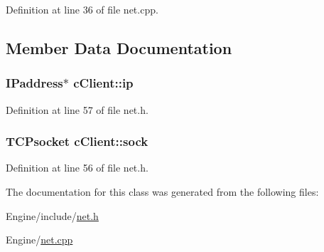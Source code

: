 Definition at line 36 of file net.\-cpp.



\subsection{Member Data Documentation}
\hypertarget{classc_client_ad1240b8a24e3339b48f07bd4de556336}{
\subsubsection[{ip}]{\setlength{\rightskip}{0pt plus 5cm}I\-Paddress$\ast$ c\-Client\-::ip}}\label{classc_client_ad1240b8a24e3339b48f07bd4de556336}


Definition at line 57 of file net.\-h.

\hypertarget{classc_client_ada06233a81c09623a3ebb76897b1d3a9}{
\subsubsection[{sock}]{\setlength{\rightskip}{0pt plus 5cm}T\-C\-Psocket c\-Client\-::sock}}\label{classc_client_ada06233a81c09623a3ebb76897b1d3a9}


Definition at line 56 of file net.\-h.



The documentation for this class was generated from the following files\-:\begin{DoxyCompactItemize}
\item 
Engine/include/\hyperlink{net_8h}{net.\-h}\item 
Engine/\hyperlink{net_8cpp}{net.\-cpp}\end{DoxyCompactItemize}
